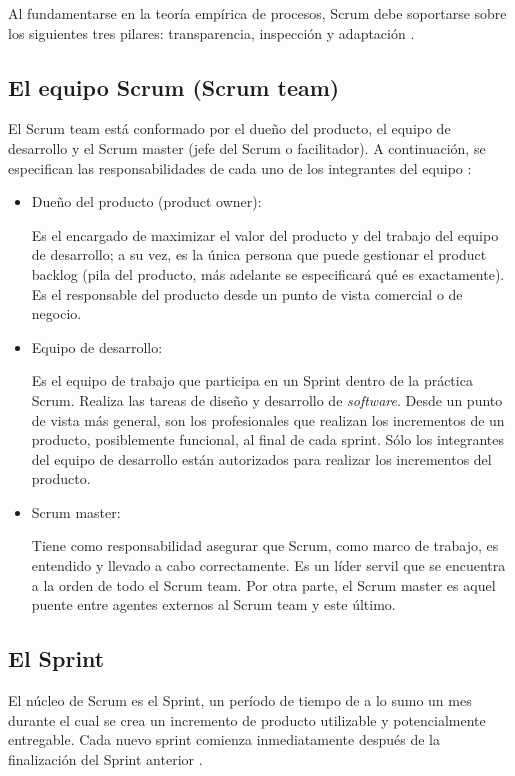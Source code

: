 Al fundamentarse en la teoría empírica de procesos, Scrum debe soportarse sobre los siguientes tres pilares: transparencia, inspección y adaptación \cite{MMSCRM}.

\subsection{El equipo Scrum (Scrum team)}
El Scrum team está conformado por el dueño del producto, el equipo de desarrollo y el Scrum master (jefe del Scrum o facilitador). A continuación, se especifican las responsabilidades de cada uno de los integrantes del equipo \cite{MMSCRM}:

\begin{itemize}[noitemsep,nolistsep]
\item {Dueño del producto (product owner):}

Es el encargado de maximizar el valor del producto y del trabajo del equipo de desarrollo; a su vez, es la única persona que puede gestionar el product backlog (pila del  producto, más adelante se especificará qué es exactamente). Es el responsable del producto desde un punto de vista comercial o de negocio.
\item {Equipo de desarrollo:}

Es el equipo de trabajo que participa en un Sprint dentro de la práctica Scrum. Realiza las tareas de diseño y desarrollo de \textit{software}. Desde un punto de vista más general, son los profesionales que realizan los incrementos de un producto, posiblemente funcional, al final de cada sprint. Sólo los integrantes del equipo de desarrollo están autorizados para realizar los incrementos del producto.
\item {Scrum master:}

Tiene como responsabilidad asegurar que Scrum, como marco de trabajo, es entendido y llevado a cabo correctamente. Es un líder servil que se encuentra a la orden de todo el Scrum team. Por otra parte, el Scrum master es aquel puente entre agentes externos al Scrum team y este último.
\end{itemize}

\subsection{El Sprint}
El núcleo de Scrum es el Sprint, un período de tiempo de a lo sumo un mes durante el cual se crea un incremento de producto utilizable y potencialmente entregable. Cada nuevo sprint comienza inmediatamente después de la finalización del Sprint anterior \cite{MMSCRM}.

